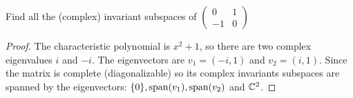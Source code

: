 \documentclass{amsart}
\begin{document}
	
\vspace{2em}

Find all the (complex) invariant subspaces of $\begin{pmatrix}
	0&1\\-1&0
	
\end{pmatrix}$

\begin{proof}
	The characteristic polynomial is $x^2+1$, so there are two complex eigenvalues $i$ and $-i$.
	The eigenvectors are $v_1=(-i,1)$ and $v_2=(i,1)$. Since the matrix is complete (diagonalizable) so its complex invariants subspaces are spanned by the eigenvectors: $\{0\}, \operatorname{span}(v_1),\operatorname{span}(v_2)$ and $\mathbb{C}^2$.
\end{proof}
\end{document}
